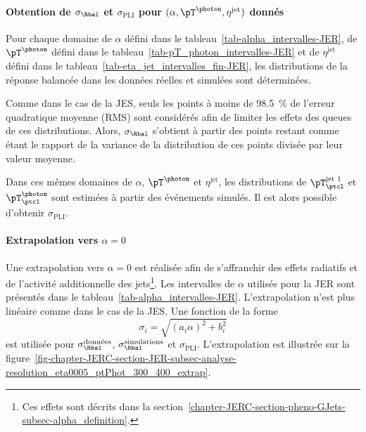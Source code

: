 \paragraph{Obtention de $\sigma_\Rbal$ et $\sigma_\text{PLI}$ pour $(\alpha, \pT^{\photon}, \eta^\text{jet})$ donnés}
Pour chaque domaine
de $\alpha$ défini dans le tableau~\ref{tab-alpha_intervalles-JER},
de $\pT^{\photon}$ défini dans le tableau~\ref{tab-pT_photon_intervalles-JER} et
de $\eta^\text{jet}$ défini dans le tableau~\ref{tab-eta_jet_intervalles_fin-JER},
les distributions de la réponse balancée dans les données réelles et simulées sont déterminées.
\par Comme dans le cas de la JES, seuls les points à moins de \SI{98.5}{\%} de l'erreur quadratique moyenne (RMS) sont considérés afin de limiter les effets des queues de ces distributions.
Alors, $\sigma_{\Rbal}$ s'obtient à partir des points restant comme étant le rapport de la variance de la distribution de ces points divisée par leur valeur moyenne.
\par
Dans ces mêmes domaines de $\alpha$, $\pT^{\photon}$ et $\eta^\text{jet}$, les distributions de $\pT^\text{jet 1}_\ptcl$ et $\pT^{\photon}_\ptcl$ sont estimées à partir des événements simulés.
Il est alors possible d'obtenir $\sigma_\text{PLI}$.
\paragraph{Extrapolation vers $\alpha=0$}
Une extrapolation vers $\alpha=0$ est réalisée afin de s'affranchir des effets radiatifs et de l'activité additionnelle des jets\footnote{Ces effets sont décrits dans la section~\ref{chapter-JERC-section-pheno-GJets-subsec-alpha_definition}.}.
Les intervalles de $\alpha$ utilisés pour la JER sont présentés dans le tableau~\ref{tab-alpha_intervalles-JER}.
L'extrapolation n'est plus linéaire comme dans le cas de la JES.
Une fonction de la forme
\begin{equation}
\sigma_i = \sqrt{(a_i\alpha)^2+b_i^2}
\end{equation}
est utilisée pour $\sigma_\Rbal^\text{données}$, $\sigma_\Rbal^\text{simulations}$ et $\sigma_\text{PLI}$.
L'extrapolation est illustrée sur la figure~\ref{fig-chapter-JERC-section-JER-subsec-analyse-resolution_eta0005_ptPhot_300_400_extrap}.
